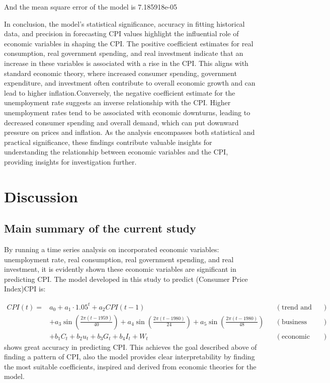 \documentclass[
  man,floatsintext,
  man]{apa6}
\begin{document}
And the mean square error of the model is 7.185918e-05

In conclusion, the model's statistical significance, accuracy in fitting historical data, and precision in forecasting CPI values highlight the influential role of economic variables in shaping the CPI. The positive coefficient estimates for real consumption, real government spending, and real investment indicate that an increase in these variables is associated with a rise in the CPI. This aligns with standard economic theory, where increased consumer spending, government expenditure, and investment often contribute to overall economic growth and can lead to higher inflation.Conversely, the negative coefficient estimate for the unemployment rate suggests an inverse relationship with the CPI. Higher unemployment rates tend to be associated with economic downturns, leading to decreased consumer spending and overall demand, which can put downward pressure on prices and inflation. As the analysis encompasses both statistical and practical significance, these findings contribute valuable insights for understanding the relationship between economic variables and the CPI, providing insights for investigation further.

\section{Discussion}\label{discussion}

\subsection{Main summary of the current study}\label{main-summary-of-the-current-study}

By running a time series analysis on incorporated economic variables: unemployment rate, real consumption, real government spending, and real investment, it is evidently shown these economic variables are significant in predicting CPI. The model developed in this study to predict (Consumer Price Index)CPI is:

\begin{align*}
CPI(t) =& a_0 + a_1 \cdot 1.05^t + a_2 CPI(t-1)  && (\text{trend and lags})\\
& + a_3 \sin\left(\frac{2\pi(t-1959)}{40}\right) + a_4 \sin\left(\frac{2\pi(t-1980)}{24}\right) + a_5 \sin\left(\frac{2\pi(t-1980)}{48}\right) && (\text{business cycle})\\
& + b_1 C_t + b_2 u_t + b_3 G_t + b_4 I_t + W_t && (\text{economic variables})
\end{align*}
shows great accuracy in predicting CPI. This achieves the goal described above of finding a pattern of CPI, also the model provides clear interpretability by finding the most suitable coefficients, inspired and derived from economic theories for the model.
\end{document}
